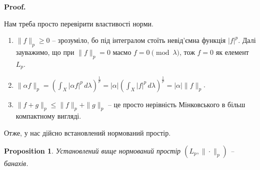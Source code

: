 \documentclass[a4paper, 10pt]{article}
\makeatletter
\theoremstyle{theoremdd}
\newtheorem{proposition}[theorem]{Proposition}
\renewenvironment{proof}[1][Proof.\\]{\par
\pushQED{\hfill \qed}%
\normalfont \topsep6\p@\@plus6\p@\relax
\trivlist
\item\relax
{\bfseries
#1\@addpunct{.}}\hspace\labelsep\ignorespaces
}{%
\popQED\endtrivlist\@endpefalse
}
\makeatother
\begin{document}
\begin{proof}
Нам треба просто перевірити властивості норми.
\begin{enumerate}[nosep,wide=0pt,label={\arabic*)}]
\item $\|f\|_p \geq 0$ -- зрозуміло, бо під інтегралом стоїть невід'ємна функція $|f|^p$. Далі зауважимо, що при $\|f\|_p = 0$ маємо $f = 0 \pmod \lambda$, тож $f = 0$ як елемент $L_p$.
\item $\| \alpha f \|_p = \displaystyle \left(\int_X |\alpha f|^p\,d\lambda \right)^{\frac{1}{p}} = |\alpha| \left(\int_X |f|^p\,d\lambda \right)^{\frac{1}{p}} = |\alpha| \|f\|_p$.
\item $\|f+g\|_p \leq \|f\|_p + \|g\|_p$ -- це просто нерівність Мінковського в більш компактному вигляді.
\end{enumerate}
Отже, у нас дійсно встановлений нормований простір.
\end{proof}

\begin{proposition}
Установлений вище нормований простір $(L_p, \|\cdot \|_p)$ -- банахів.
\end{proposition}
\end{document}
